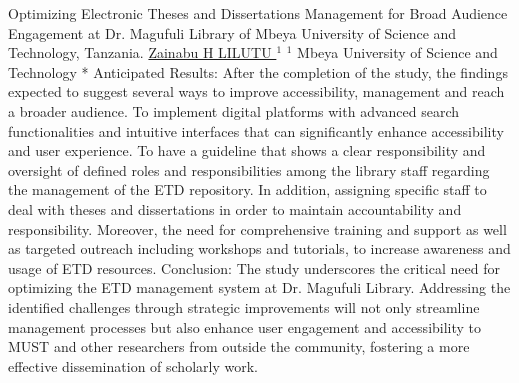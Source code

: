 \begin{abstract_online}{Optimizing Electronic Theses and Dissertations Management for Broad Audience Engagement at Dr. Magufuli Library of Mbeya University of Science and Technology, Tanzania.}{%
        \underline{ Zainabu H LILUTU }$^{1}$}{%
        }{%
        $^1$ Mbeya University of Science and Technology *\newline{}
            }
	Anticipated Results: After the completion of the study, the findings expected to suggest several ways to improve accessibility, management and reach a broader audience.
	To implement digital platforms with advanced search functionalities and intuitive interfaces that can significantly enhance accessibility and user experience. To have a guideline that shows a clear responsibility and oversight of defined roles and responsibilities among the library staff regarding the management of the ETD repository.
	In addition, assigning specific staff to deal with theses and dissertations in order to maintain accountability and responsibility. Moreover, the need for comprehensive training and support as well as targeted outreach including workshops and tutorials, to increase awareness and usage of ETD resources. 
	Conclusion: The study underscores the critical need for optimizing the ETD management system at Dr. Magufuli Library. Addressing the identified challenges through strategic improvements will not only streamline management processes but also enhance user engagement and accessibility to MUST and other researchers from outside the community, fostering a more effective dissemination of scholarly work.  
    \end{abstract_online}
    
